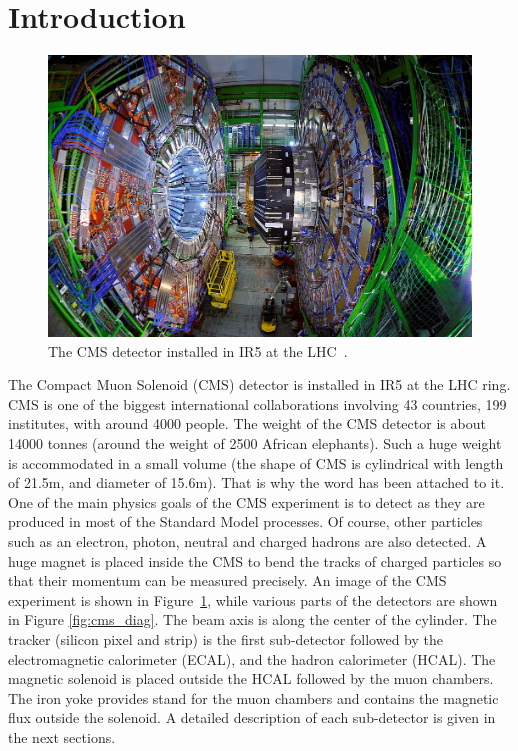 \section{Introduction}
\label{s:secIntroCMS}
\begin{figure}
  \begin{center}
  \includegraphics[width=0.90\linewidth]{Experiment/CMS/Image/cms.png}
  \caption{The CMS detector installed in IR5 at the LHC~\cite{Collaboration_2008_CMS}.}
  \label{fig:cms_exp}
  \end{center}
\end{figure}
The Compact Muon Solenoid (CMS) detector is installed in IR5 at the LHC ring. 
CMS is one of the biggest international collaborations involving 43 countries, 
199 institutes, with around 4000 people. The weight of the CMS detector is about 
14000 tonnes (around the weight of 2500 African elephants). Such a huge weight is 
accommodated in a small volume (the shape of CMS is cylindrical with length of 
21.5\unit{m}, and diameter of 15.6\unit{m}). That is why the  word has been 
attached to it. One of the main physics goals of the CMS experiment is to detect  
as they are produced in most of the Standard Model processes. Of course, other particles 
such as an electron, photon, neutral and charged hadrons are also detected. A huge 
 magnet is placed inside the CMS to bend the tracks of charged particles so that 
their momentum can be measured precisely. An image of the CMS experiment is shown
in Figure~\ref{fig:cms_exp}, while various parts of the detectors are shown in Figure
\ref{fig:cms_diag}. The beam axis is along the center of the cylinder. The 
tracker (silicon pixel and strip) is the first sub-detector followed by the 
electromagnetic calorimeter (ECAL), and the hadron calorimeter (HCAL). The
magnetic solenoid is placed outside the HCAL followed by the muon chambers.
The iron yoke provides stand for the muon chambers and contains the magnetic 
flux outside the solenoid. A detailed description of each 
sub-detector is given in the next sections. 


